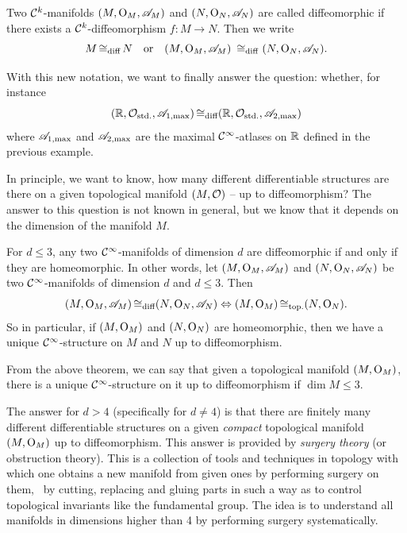\begin{definition}[Diffeomorphic]
	Two \(\mathcal C^{k}\)-manifolds \((M, \mathrm{O}_M, \mathscr{A}_M)\) and \((N, \mathrm{O}_N, \mathscr{A}_N)\) are called diffeomorphic if there exists a \(\mathcal C^{k}\)-diffeomorphism \(f: M \to N\). Then we write
	\begin{equation}
		M \operatorname{\mathrel{\cong_{\text{diff}}}} N \quad \text{or} \quad (M, \mathrm{O}_M, \mathscr{A}_M) ~\operatorname{\mathrel{\cong_{\text{diff}}}}~ (N, \mathrm{O}_N, \mathscr{A}_N).
	\end{equation}
\end{definition}

With this new notation, we want to finally answer the question: whether, for instance
\begin{equation}
	(\mathbb R, \mathcal{O}_{\text{std.}}, \mathscr{A}_{1, \text{max}}) \operatorname{\mathrel{\cong_{\text{diff}}}} (\mathbb R, \mathcal{O}_{\text{std.}}, \mathscr{A}_{2, \text{max}})
\end{equation}
where \(\mathscr{A}_{1, \text{max}}\) and \(\mathscr{A}_{2, \text{max}}\) are the maximal \(\mathcal C^{\infty}\)-atlases on \(\mathbb R\) defined in the previous example.

In principle, we want to know, how many different differentiable structures are there on a given topological manifold \((M, \mathcal{O})\) -- up to diffeomorphism? The answer to this question is not known in general, but we know that it depends on the dimension of the manifold \(M\).

\begin{theorem}
	For \(d \le 3\), any two \(\mathcal C^{\infty}\)-manifolds of dimension \(d\) are diffeomorphic if and only if they are homeomorphic. In other words, let \((M, \mathrm{O}_M, \mathscr{A}_M)\) and \((N, \mathrm{O}_N, \mathscr{A}_N)\) be two \(\mathcal C^{\infty}\)-manifolds of dimension \(d\) and \(d \le 3\). Then
	\begin{equation}
		(M, \mathrm{O}_M, \mathscr{A}_M) \operatorname{\mathrel{\cong_{\text{diff}}}} (N, \mathrm{O}_N, \mathscr{A}_N) \Leftrightarrow (M, \mathrm{O}_M) \operatorname{\mathrel{\cong_{\text{top.}}}} (N, \mathrm{O}_N).
	\end{equation}
	So in particular, if \((M, \mathrm{O}_M)\) and \((N, \mathrm{O}_N)\) are homeomorphic, then we have a unique \(\mathcal C^{\infty}\)-structure on \(M\) and \(N\) up to diffeomorphism.
\end{theorem}

From the above theorem, we can say that given a topological manifold \((M, \mathrm{O}_M)\), there is a unique \(\mathcal C^{\infty}\)-structure on it up to diffeomorphism if \(\dim M \le 3\).

The answer for \(d > 4\) (specifically for \(d \ne 4\)) is that there are finitely many different differentiable structures on a given \emph{compact} topological manifold \((M, \mathrm{O}_M)\) up to diffeomorphism. This answer is provided by \emph{surgery theory} (or obstruction theory). This is a collection of tools and techniques in topology with which one obtains a new manifold from given ones by performing surgery on them, \ie\ by cutting, replacing and gluing parts in such a way as to control topological invariants like the fundamental group. The idea is to understand all manifolds in dimensions higher than 4 by performing surgery systematically.

